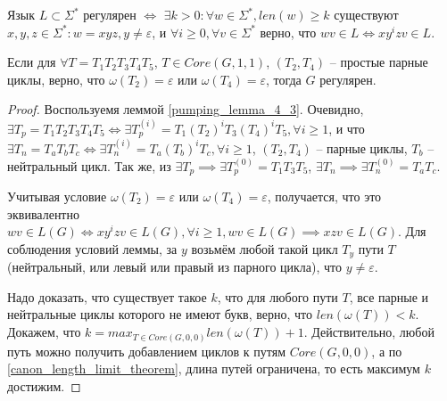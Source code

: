 \begin{lemma}
    Язык $L \subset \Sigma^*$ регулярен $\iff$ $\exists k > 0: \forall w \in \Sigma^*, len(w) \geq k$ существуют $x,y,z \in \Sigma^*: w=xyz, y \neq \varepsilon$,
    и $\forall i \geq 0, \forall v \in \Sigma^*$ верно, что $wv \in L \iff xy^izv \in L$. 
\end{lemma}
\label{pumping_lemma_4_3}

\begin{theorem}
    Если для $\forall T = T_1 T_2 T_3 T_4 T_5$, $T \in Core(G, 1, 1)$, $(T_2, T_4)$ -- простые парные циклы, 
    верно, что $\omega(T_2) = \varepsilon$ или $\omega(T_4) = \varepsilon$,
    тогда $G$ регулярен.
\end{theorem}

\begin{proof}
    Воспользуемя леммой \ref{pumping_lemma_4_3}.
    Очевидно,
    $\exists T_p = T_1 T_2 T_3 T_4 T_5 \iff \exists T^{(i)}_p = T_1 (T_2)^i T_3 (T_4)^i T_5, \forall i \geq 1$,
    и что $\exists T_n = T_a T_b T_c \iff \exists T^{(i)}_n = T_a (T_b)^i T_c, \forall i \geq 1$,
    $(T_2,T_4)$ -- парные циклы, $T_b$ -- нейтральный цикл.
    Так же, из $\exists T_p \implies \exists T^{(0)}_p = T_1 T_3 T_5$, $\exists T_n \implies \exists T^{(0)}_n = T_a T_c$. 

    Учитывая условие $\omega(T_2) = \varepsilon$ или $\omega(T_4) = \varepsilon$, получается,
    что это эквивалентно $wv \in L(G) \iff xy^izv \in L(G), \forall i \geq 1, wv \in L(G) \implies xzv \in L(G)$. Для соблюдения условий леммы, 
    за $y$ возьмём любой такой цикл $T_y$ пути $T$ (нейтральный, или левый или правый из парного цикла), 
    что $y \neq \varepsilon$. 


    Надо доказать, что существует такое $k$, что для любого пути $T$, все парные и нейтральные циклы которого не имеют букв, 
    верно, что $len(\omega(T)) < k$. Докажем, что $k = max_{T \in Core(G, 0, 0)} len(\omega(T)) + 1$. Действительно, любой путь
    можно получить добавлением циклов к путям $Core(G,0,0)$, а по \ref{canon_length_limit_theorem}, длина путей ограничена, то есть
    максимум $k$ достижим.

\end{proof}

\clearpage